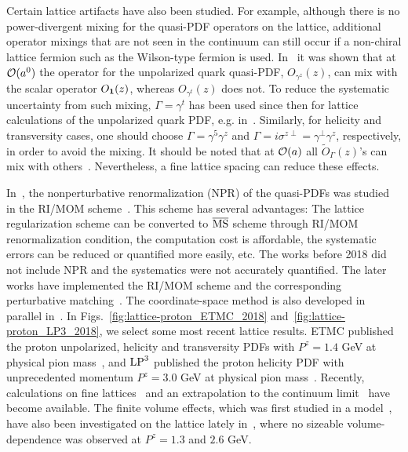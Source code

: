 Certain lattice artifacts have also been studied. For example, although there is no power-divergent mixing for the quasi-PDF operators on the lattice, additional operator mixings that are not seen in the continuum can still occur if a non-chiral lattice fermion such as the Wilson-type fermion is used.
%
In~\cite{Constantinou:2017sej,Chen:2017mie} it was shown that at ${\cal O}(a^0)$ the operator for the unpolarized quark quasi-PDF, $O_{\gamma^z}(z)$, can mix with the scalar operator $O_{\bf 1}(z)$, whereas $O_{\gamma^t}(z)$ does not.
%
To reduce the systematic uncertainty from such mixing, $\Gamma=\gamma^t$ has been used since then for lattice calculations of the unpolarized quark PDF, e.g. in~\cite{Alexandrou:2017huk,Green:2017xeu,Chen:2017mzz}. Similarly, for helicity and transversity cases, one should choose $\Gamma=\gamma^5\gamma^z$ and $\Gamma=i\sigma^{z\perp}=\gamma^\perp\gamma^z$, respectively, in order to avoid the mixing.
%
It should be noted that at ${\cal O}(a)$ all $\tilde{O}_\Gamma(z)$'s can mix with others~\cite{Chen:2017mie}. Nevertheless, a fine lattice spacing can reduce these effects.

In~\cite{Alexandrou:2017huk,Chen:2017mzz,Green:2017xeu}, the nonperturbative renormalization (NPR) of the quasi-PDFs was studied in the RI/MOM scheme~\cite{Martinelli:1994ty}.
%
This scheme has several advantages: The lattice regularization scheme can be converted to $\overline{\rm MS}$ scheme through RI/MOM renormalization condition,
the computation cost is affordable,
the systematic errors can be reduced or quantified more easily, etc.
%
The works before 2018 did not include NPR and the systematics were not accurately quantified.
%
The later works have implemented the RI/MOM scheme and the corresponding perturbative matching~\cite{Constantinou:2017sej,Stewart:2017tvs,Liu:2018uuj}.
%
The coordinate-space method is also developed in parallel in~\cite{Orginos:2017kos,Cichy:2019ebf,Joo:2019jct,Joo:2020spy,Bhat:2020ktg}.
%
%
In Figs.~\ref{fig:lattice-proton_ETMC_2018} and~\ref{fig:lattice-proton_LP3_2018}, we select some most recent lattice results.
%
ETMC published the proton unpolarized, helicity and transversity PDFs with $P^z=1.4$ GeV at physical pion mass~\cite{Alexandrou:2018pbm,Alexandrou:2018eet}, and ${\rm LP}^3$ published the proton helicity PDF with unprecedented momentum $P^z=3.0$ GeV at physical pion mass~\cite{Lin:2018qky}. Recently, calculations on fine lattices~\cite{Fan:2020nzz,Alexandrou:2020qtt} and an extrapolation to the continuum limit~\cite{Alexandrou:2020qtt} have become available. The finite volume effects, which was first studied in a model~\cite{Briceno:2018lfj}, have also been investigated on the lattice lately in~\cite{Lin:2019ocg}, where no sizeable volume-dependence was observed at $P^z=1.3$ and $2.6$ GeV.

